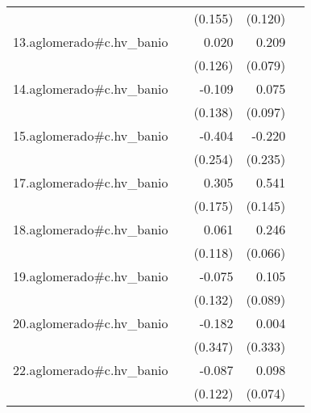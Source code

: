 {\begin{longtable}{l*{4}{D{.}{.}{-1}}}
            &                     &     (0.155)         &     (0.120)         &                     \\
\addlinespace
13.aglomerado#c.hv\_banio&                     &       0.020         &       0.209\sym{**} &                     \\
            &                     &     (0.126)         &     (0.079)         &                     \\
\addlinespace
14.aglomerado#c.hv\_banio&                     &      -0.109         &       0.075         &                     \\
            &                     &     (0.138)         &     (0.097)         &                     \\
\addlinespace
15.aglomerado#c.hv\_banio&                     &      -0.404         &      -0.220         &                     \\
            &                     &     (0.254)         &     (0.235)         &                     \\
\addlinespace
17.aglomerado#c.hv\_banio&                     &       0.305         &       0.541\sym{***}&                     \\
            &                     &     (0.175)         &     (0.145)         &                     \\
\addlinespace
18.aglomerado#c.hv\_banio&                     &       0.061         &       0.246\sym{***}&                     \\
            &                     &     (0.118)         &     (0.066)         &                     \\
\addlinespace
19.aglomerado#c.hv\_banio&                     &      -0.075         &       0.105         &                     \\
            &                     &     (0.132)         &     (0.089)         &                     \\
\addlinespace
20.aglomerado#c.hv\_banio&                     &      -0.182         &       0.004         &                     \\
            &                     &     (0.347)         &     (0.333)         &                     \\
\addlinespace
22.aglomerado#c.hv\_banio&                     &      -0.087         &       0.098         &                     \\
            &                     &     (0.122)         &     (0.074)         &                     \\

\end{longtable}}
